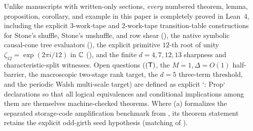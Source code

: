 Unlike manuscripts with written-only sections, \emph{every} numbered theorem, lemma, proposition,
corollary, and example in this paper is completely proved in Lean~4, including the explicit
$3$-work-tape and $2$-work-tape  transition-table constructions for Stone's
shuffle, Stone's unshuffle, and row shear (), the native symbolic causal-cone
tree evaluators (), the
explicit primitive $12$-th root of unity $\zeta_{12} = \exp(2\pi i / 12)$ in $\mathbb{C}$
(), and the finite $d = 4, 7, 12, 13$ sharpness and characteristic-split
witnesses. Open questions ($(\mathsf{T})$, the $M=1, \Delta=O(1)$ half-barrier, the macroscopic two-stage
rank target, the $d=5$ three-term threshold, and the periodic Walsh multi-scale target) are defined
as explicit `: Prop` declarations so that all logical equivalences and conditional implications
among them are themselves machine-checked theorems. Where (a) formalizes
the separated storage-code amplification benchmark from \cite{HighRate2026}, its theorem statement
retains the explicit odd-girth seed hypothesis  (matching
 of \cite[Definition~5.1]{HighRate2026}).
